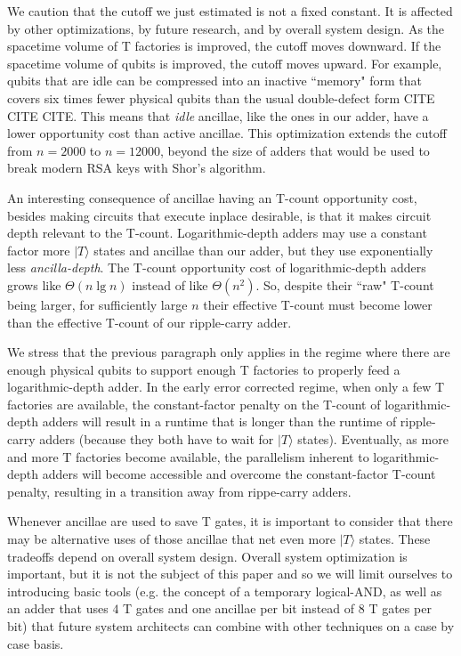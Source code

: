 \documentclass[twocolumn]{quantumarticle-customized}
\begin{document}
We caution that the cutoff we just estimated is not a fixed constant.
It is affected by other optimizations, by future research, and by overall system design.
As the spacetime volume of T factories is improved, the cutoff moves downward.
If the spacetime volume of qubits is improved, the cutoff moves upward.
For example, qubits that are idle can be compressed into an inactive ``memory" form that covers six times fewer physical qubits than the usual double-defect form {\color{red} CITE CITE CITE}.
This means that {\em idle} ancillae, like the ones in our adder, have a lower opportunity cost than active ancillae.
This optimization extends the cutoff from $n=2000$ to $n=12000$, beyond the size of adders that would be used to break modern RSA keys with Shor's algorithm.

An interesting consequence of ancillae having an T-count opportunity cost, besides making circuits that execute inplace desirable, is that it makes circuit depth relevant to the T-count.
Logarithmic-depth adders may use a constant factor more $|T\rangle$ states and ancillae than our adder, but they use exponentially less {\em ancilla-depth}.
The T-count opportunity cost of logarithmic-depth adders grows like $\Theta(n \lg n)$ instead of like $\Theta(n^2)$.
So, despite their ``raw" T-count being larger, for sufficiently large $n$ their effective T-count must become lower than the effective T-count of our ripple-carry adder.

We stress that the previous paragraph only applies in the regime where there are enough physical qubits to support enough T factories to properly feed a logarithmic-depth adder.
In the early error corrected regime, when only a few T factories are available, the constant-factor penalty on the T-count of logarithmic-depth adders will result in a runtime that is longer than the runtime of ripple-carry adders (because they both have to wait for $|T\rangle$ states).
Eventually, as more and more T factories become available, the parallelism inherent to logarithmic-depth adders will become accessible and overcome the constant-factor T-count penalty, resulting in a transition away from rippe-carry adders.

Whenever ancillae are used to save T gates, it is important to consider that there may be alternative uses of those ancillae that net even more $|T\rangle$ states.
These tradeoffs depend on overall system design.
Overall system optimization is important, but it is not the subject of this paper and so we will limit ourselves to introducing basic tools (e.g. the concept of a temporary logical-AND, as well as an adder that uses $4$ T gates and one ancillae per bit instead of $8$ T gates per bit) that future system architects can combine with other techniques on a case by case basis.
\end{document}
